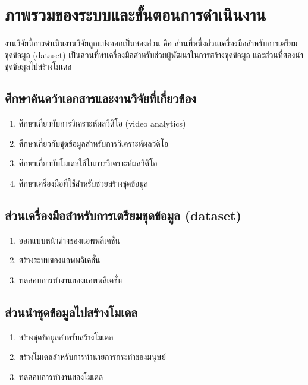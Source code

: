 \section{ภาพรวมของระบบและขั้นตอนการดำเนินงาน}
งานวิจัยนี้การดำเนินงานวิจัยถูกแบ่งออกเป็นสองส่วน คือ ส่วนที่หนึ่งส่วนเครื่องมือสำหรับการเตรียมชุดข้อมูล (dataset) เป็นส่วนที่ทำเครื่องมือสำหรับช่วยผู้พัฒนาในการสร้างชุดข้อมูล และส่วนที่สองนำชุดข้อมูลไปสร้างโมเดล
\subsection*{ศึกษาค้นคว้าเอกสารและงานวิจัยที่เกี่ยวข้อง}
\begin{enumerate}\setlength\itemsep{-0.25em}
	\item ศึกษาเกี่ยวกับการวิเคราะห์ผลวิดิโอ (video analytics)
	\item ศึกษาเกี่ยวกับชุดข้อมูลสำหรับการวิเคราะห์ผลวิดิโอ
	\item ศึกษาเกี่ยวกับโมเดลใช้ในการวิเคราะห์ผลวิดิโอ
	\item ศึกษาเครื่องมือที่ใช้สำหรับช่วยสร้างชุดข้อมูล
\end{enumerate}
\subsection*{ส่วนเครื่องมือสำหรับการเตรียมชุดข้อมูล (dataset)}
\begin{enumerate}\setlength\itemsep{-0.25em}
	\item ออกแบบหน้าต่างของแอพพลิเคชั่น
	\item สร้างระบบของแอพพลิเคชั่น
	\item ทดสอบการทำงานของแอพพลิเคชั่น
\end{enumerate}
\subsection*{ส่วนนำชุดข้อมูลไปสร้างโมเดล}
\begin{enumerate}\setlength\itemsep{-0.25em}
	\item สร้างชุดข้อมูลสำหรับสร้างโมเดล
	\item สร้างโมเดลสำหรับการทำนายการกระทำของมนุษย์
	\item ทดสอบการทำงานของโมเดล
\end{enumerate}
\clearpage
